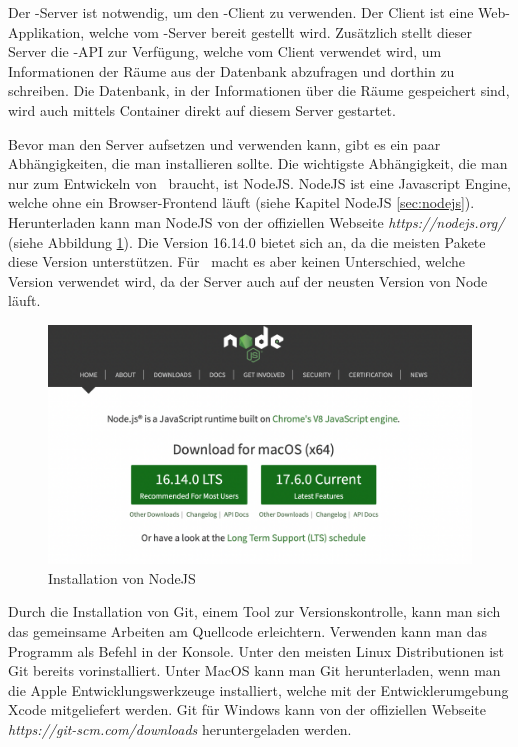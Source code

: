 
Der \ZELIA-Server ist notwendig, um den \ZELIA-Client zu verwenden. Der Client ist eine Web-Applikation, welche vom \ZELIA-Server bereit gestellt wird. Zusätzlich stellt dieser Server die \ZELIA-API zur Verfügung, welche vom Client verwendet wird, um Informationen der Räume aus der Datenbank abzufragen und dorthin zu schreiben. Die Datenbank, in der Informationen über die Räume gespeichert sind, wird auch mittels Container direkt auf diesem Server gestartet.

\begin{minipage}{\textwidth}
    
    Bevor man den Server aufsetzen und verwenden kann, gibt es ein paar Abhängigkeiten, die man installieren sollte. Die wichtigste Abhängigkeit, die man nur zum Entwickeln von \ZELIA\ braucht, ist NodeJS. NodeJS ist eine Javascript Engine, welche ohne ein Browser-Frontend läuft (siehe Kapitel NodeJS \ref{sec:nodejs}). Herunterladen kann man NodeJS von der offiziellen Webseite \emph{https://nodejs.org/} (siehe Abbildung \ref{fig:nodejsdownload}). Die Version 16.14.0 bietet sich an, da die meisten Pakete diese Version unterstützen. Für \ZELIA\ macht es aber keinen Unterschied, welche Version verwendet wird, da der Server auch auf der neusten Version von Node läuft.
\end{minipage}
    
\begin{figure}[H]
    \centering
    \includegraphics[width=120mm]{media/Handbuch/nodejs.png}
    \caption{Installation von NodeJS}
    \label{fig:nodejsdownload}
\end{figure}


Durch die Installation von Git, einem Tool zur Versionskontrolle, kann man sich das gemeinsame Arbeiten am Quellcode erleichtern. Verwenden kann man das Programm als Befehl in der Konsole. Unter den meisten Linux Distributionen ist Git bereits vorinstalliert. Unter MacOS kann man Git herunterladen, wenn man die Apple Entwicklungswerkzeuge installiert, welche mit der Entwicklerumgebung Xcode mitgeliefert werden. Git für Windows kann von der offiziellen Webseite \emph{https://git-scm.com/downloads} heruntergeladen werden.

